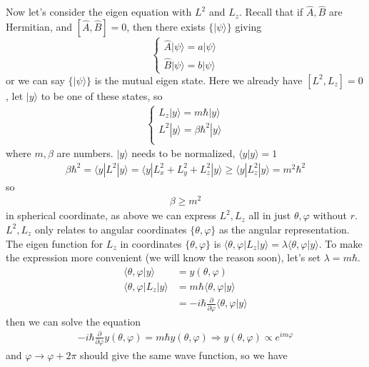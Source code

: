 \documentclass[UTF8,12pt]{article} %
\begin{document}
Now let's consider the eigen equation with $L^{2}$ and $L_{z}$. Recall that if $\hat{A}, \hat{B}$ are Hermitian, and $[\hat{A}, \hat{B}] = 0$, then there exists $\{|\psi\rangle\}$ giving
$$\begin{cases}\hat{A}|\psi\rangle = a|\psi\rangle \\ \hat{B}|\psi\rangle = b|\psi\rangle\end{cases}$$
or we can say $\{|\psi\rangle\}$ is the mutual eigen state. Here we already have $[L^{2}, L_{z}] = 0$, let $|y\rangle$ to be one of these states, so
\begin{align}
\begin{cases}
L_{z}|y\rangle = m\hbar|y\rangle \\
L^{2}|y\rangle = \beta\hbar^{2}|y\rangle \\
\end{cases}
\end{align}
where $m,\beta$ are numbers. $|y\rangle$ needs to be normalized, $\langle y|y\rangle = 1$
\begin{align}
\beta\hbar^{2} = \langle y|L^{2}|y\rangle = \langle y|L_{x}^{2} + L_{y}^{2} + L_{z}^{2}|y\rangle \ge \langle y|L_{z}^{2}|y\rangle = m^{2}\hbar^{2}
\end{align}
so
\begin{align}
\beta \ge m^{2}
\end{align}
    in spherical coordinate, as above we can express $L^{2}, L_{z}$ all in just $\theta, \varphi$ without $r$. $L^{2}, L_{z}$ only relates to angular coordinates $\{\theta, \varphi\}$ as the angular representation. The eigen function for $L_{z}$ in coordinates $\{\theta, \varphi\}$ is $\langle\theta,\varphi|L_{z}|y\rangle = \lambda\langle\theta,\varphi|y\rangle$. To make the expression more convenient (we will know the reason soon), let's set $\lambda = m\hbar$.
\begin{align}
\langle\theta, \varphi|y\rangle &= y(\theta, \varphi) \\
\langle\theta,\varphi|L_{z}|y\rangle &= m\hbar\langle\theta,\varphi|y\rangle \\
&= -i\hbar\frac{\partial}{\partial\varphi}\langle\theta,\varphi|y\rangle
\end{align}
then we can solve the equation
\begin{align}
-i\hbar\frac{\partial}{\partial\varphi} y(\theta,\varphi) = m\hbar y(\theta,\varphi) \Rightarrow y(\theta,\varphi) \propto e^{im\varphi}
\label{Lz}
\end{align}
and $\varphi \rightarrow \varphi + 2\pi$ should give the same wave function, so we have
\end{document}
